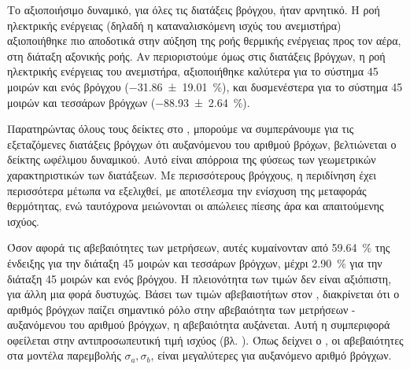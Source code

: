 Το αξιοποιήσιμο δυναμικό, για όλες τις διατάξεις βρόγχου, ήταν αρνητικό. Η ροή ηλεκτρικής ενέργειας (δηλαδή η καταναλισκόμενη ισχύς του ανεμιστήρα) αξιοποιήθηκε πιο αποδοτικά στην αύξηση της ροής θερμικής ενέργειας προς τον αέρα, στη διάταξη αξονικής ροής. Αν περιοριστούμε όμως στις διατάξεις βρόγχων, η ροή ηλεκτρικής ενέργειας του ανεμιστήρα, αξιοποιήθηκε καλύτερα για το σύστημα 45 μοιρών και ενός βρόγχου (\qty[separate-uncertainty-units = single]{-31.86(1901)}{\percent}), και δυσμενέστερα για το σύστημα 45 μοιρών και τεσσάρων βρόγχων (\qty[separate-uncertainty-units = single]{-88.93(264)}{\percent}).

Παρατηρώντας όλους τους δείκτες στο , μπορούμε να συμπεράνουμε για τις εξεταζόμενες διατάξεις βρόγχων ότι αυξανόμενου του αριθμού βρόχων, βελτιώνεται ο δείκτης ωφέλιμου δυναμικού. Αυτό είναι απόρροια της φύσεως των γεωμετρικών χαρακτηριστικών των διατάξεων. Με περισσότερους βρόγχους, η περιδίνηση έχει περισσότερα μέτωπα να εξελιχθεί, με αποτέλεσμα την ενίσχυση της μεταφοράς θερμότητας, ενώ ταυτόχρονα μειώνονται οι απώλειες πίεσης άρα και απαιτούμενης ισχύος.

Όσον αφορά τις αβεβαιότητες των μετρήσεων, αυτές κυμαίνονταν από \qty{59.64}{\percent} της ένδειξης για την διάταξη 45 μοιρών και τεσσάρων βρόγχων, μέχρι \qty{2.90}{\percent} για την διάταξη 45 μοιρών και ενός βρόγχου. H πλειονότητα των τιμών δεν είναι αξιόπιστη, για άλλη μια φορά δυστυχώς. Βάσει των τιμών αβεβαιοτήτων στον , διακρίνεται ότι ο αριθμός βρόγχων παίζει σημαντικό ρόλο στην αβεβαιότητα των μετρήσεων - αυξανόμενου του αριθμού βρόγχων, η αβεβαιότητα αυξάνεται. Αυτή η συμπεριφορά οφείλεται στην αντιπροσωπευτική τιμή ισχύος (βλ. ). Όπως δείχνει ο , οι αβεβαιότητες στα μοντέλα παρεμβολής $\sigma _a,\sigma _b$, είναι μεγαλύτερες για αυξανόμενο αριθμό βρόγχων.